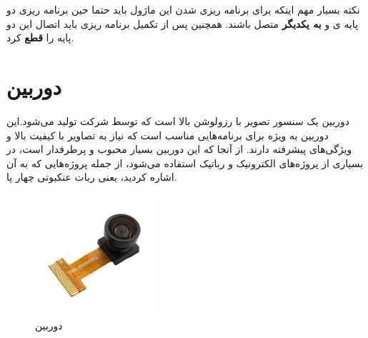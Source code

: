 نکته بسیار مهم اینکه برای برنامه ریزی شدن این ماژول باید حتما حین برنامه ریزی دو پایه ی
و
\textbf{به یکدیگر}
متصل باشند. همچنین پس از تکمیل برنامه ریزی باید اتصال این دو پایه را
\textbf{قطع}
کرد.

\newpage
\section{دوربین }
دوربین  یک سنسور تصویر  با رزولوشن بالا است که توسط شرکت  تولید می‌شود.این دوربین به ویژه برای برنامه‌هایی مناسب است که نیاز به تصاویر با کیفیت بالا و ویژگی‌های پیشرفته دارند. از آنجا که این دوربین بسیار محبوب و پرطرفدار است، در بسیاری از پروژه‌های الکترونیک و رباتیک استفاده می‌شود، از جمله پروژه‌هایی که به آن اشاره کردید، یعنی ربات عنکبوتی چهار پا.


\begin{figure}[H]
	\centering
	\includegraphics[width=0.4\textwidth]{./images/Chapter4/OV2640}
	\caption[دوربین ]{دوربین  \cite{OV2640}}
	\label{عکس دوربین}
\end{figure}

